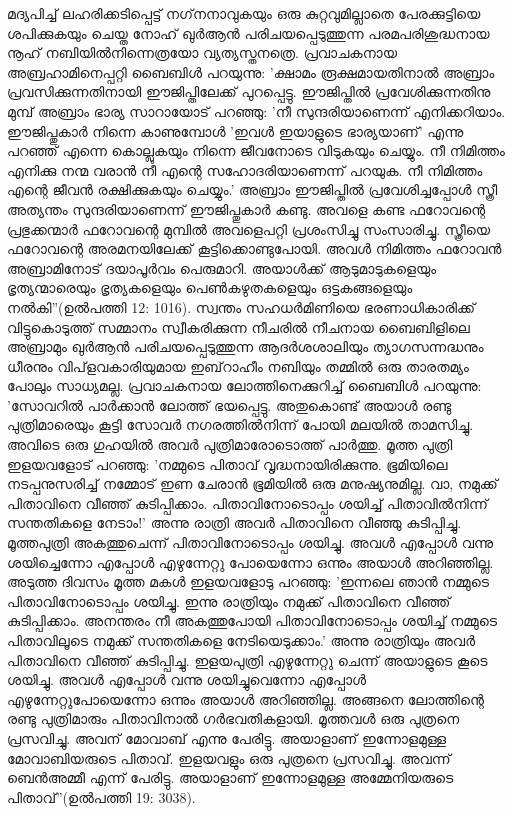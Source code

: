 മദ്യപിച്ച് ലഹരിക്കടിപ്പെട്ട് നഗ്‌നനാവുകയും ഒരു കുറ്റവുമില്ലാതെ പേരക്കുട്ടിയെ ശപിക്കുകയും ചെയ്ത നോഹ് ഖുര്‍ആന്‍ പരിചയപ്പെടുത്തുന്ന പരമപരിശുദ്ധനായ നൂഹ് നബിയില്‍നിന്നെത്രയോ വ്യത്യസ്തനത്രെ.
പ്രവാചകനായ അബ്രഹാമിനെപ്പറ്റി ബൈബിള്‍ പറയുന്നു: 'ക്ഷാമം രൂക്ഷമായതിനാല്‍ അബ്രാം പ്രവസിക്കുന്നതിനായി ഈജിപ്തിലേക്ക് പുറപ്പെട്ടു. ഈജിപ്തില്‍ പ്രവേശിക്കുന്നതിനു മുമ്പ് അബ്രാം ഭാര്യ സാറായോട് പറഞ്ഞു: 'നീ സുന്ദരിയാണെന്ന് എനിക്കറിയാം. ഈജിപ്തുകാര്‍ നിന്നെ കാണുമ്പോള്‍ 'ഇവള്‍ ഇയാളുടെ ഭാര്യയാണ്' എന്നു പറഞ്ഞ് എന്നെ കൊല്ലുകയും നിന്നെ ജീവനോടെ വിടുകയും ചെയ്യും. നീ നിമിത്തം എനിക്കു നന്മ വരാന്‍ നീ എന്റെ സഹോദരിയാണെന്ന് പറയുക. നീ നിമിത്തം എന്റെ ജീവന്‍ രക്ഷിക്കുകയും ചെയ്യും.' അബ്രാം ഈജിപ്തില്‍ പ്രവേശിച്ചപ്പോള്‍ സ്ത്രീ അത്യന്തം സുന്ദരിയാണെന്ന് ഈജിപ്തുകാര്‍ കണ്ടു. അവളെ കണ്ട ഫറോവന്റെ പ്രഭുക്കന്മാര്‍ ഫറോവന്റെ മുമ്പില്‍ അവളെപറ്റി പ്രശംസിച്ചു സംസാരിച്ചു. സ്ത്രീയെ ഫറോവന്റെ അരമനയിലേക്ക് കൂട്ടിക്കൊണ്ടുപോയി. അവള്‍ നിമിത്തം ഫറോവന്‍ അബ്രാമിനോട് ദയാപൂര്‍വം പെരുമാറി. അയാള്‍ക്ക് ആടുമാടുകളെയും ഭൃത്യന്മാരെയും ഭൃത്യകളെയും പെണ്‍കഴുതകളെയും ഒട്ടകങ്ങളെയും നല്‍കി''(ഉല്‍പത്തി 12: 1016).
സ്വന്തം സഹധര്‍മിണിയെ ഭരണാധികാരിക്ക് വിട്ടുകൊടുത്ത് സമ്മാനം സ്വീകരിക്കുന്ന നീചരില്‍ നീചനായ ബൈബിളിലെ അബ്രാമും ഖുര്‍ആന്‍ പരിചയപ്പെടുത്തുന്ന ആദര്‍ശശാലിയും ത്യാഗസന്നദ്ധനും ധീരനും വിപ്‌ളവകാരിയുമായ ഇബ്‌റാഹീം നബിയും തമ്മില്‍ ഒരു താരതമ്യം പോലും സാധ്യമല്ല.
പ്രവാചകനായ ലോത്തിനെക്കുറിച്ച് ബൈബിള്‍ പറയുന്നു: 'സോവറില്‍ പാര്‍ക്കാന്‍ ലോത്ത് ഭയപ്പെട്ടു. അതുകൊണ്ട് അയാള്‍ രണ്ടു പുത്രിമാരെയും കൂട്ടി സോവര്‍ നഗരത്തില്‍നിന്ന് പോയി മലയില്‍ താമസിച്ചു. അവിടെ ഒരു ഗുഹയില്‍ അവര്‍ പുത്രിമാരോടൊത്ത് പാര്‍ത്തു. മൂത്ത പുത്രി ഇളയവളോട് പറഞ്ഞു: 'നമ്മുടെ പിതാവ് വൃദ്ധനായിരിക്കുന്നു. ഭൂമിയിലെ നടപ്പനുസരിച്ച് നമ്മോട് ഇണ ചേരാന്‍ ഭൂമിയില്‍ ഒരു മനുഷ്യനുമില്ല. വാ, നമുക്ക് പിതാവിനെ വീഞ്ഞ് കുടിപ്പിക്കാം. പിതാവിനോടൊപ്പം ശയിച്ച് പിതാവില്‍നിന്ന് സന്തതികളെ നേടാം!' അന്നു രാത്രി അവര്‍ പിതാവിനെ വീഞ്ഞു കുടിപ്പിച്ചു. മൂത്തപുത്രി അകത്തുചെന്ന് പിതാവിനോടൊപ്പം ശയിച്ചു. അവള്‍ എപ്പോള്‍ വന്നു ശയിച്ചെന്നോ എപ്പോള്‍ എഴുന്നേറ്റു പോയെന്നോ ഒന്നും അയാള്‍ അറിഞ്ഞില്ല. അടുത്ത ദിവസം മൂത്ത മകള്‍ ഇളയവളോടു പറഞ്ഞു: 'ഇന്നലെ ഞാന്‍ നമ്മുടെ പിതാവിനോടൊപ്പം ശയിച്ചു. ഇന്നു രാത്രിയും നമുക്ക് പിതാവിനെ വീഞ്ഞ് കുടിപ്പിക്കാം. അനന്തരം നീ അകത്തുപോയി പിതാവിനോടൊപ്പം ശയിച്ച് നമ്മുടെ പിതാവിലൂടെ നമുക്ക് സന്തതികളെ നേടിയെടുക്കാം.' അന്നു രാത്രിയും അവര്‍ പിതാവിനെ വീഞ്ഞ് കുടിപ്പിച്ചു. ഇളയപുത്രി എഴുന്നേറ്റു ചെന്ന് അയാളുടെ കൂടെ ശയിച്ചു. അവള്‍ എപ്പോള്‍ വന്നു ശയിച്ചുവെന്നോ എപ്പോള്‍ എഴുന്നേറ്റുപോയെന്നോ ഒന്നും അയാള്‍ അറിഞ്ഞില്ല. അങ്ങനെ ലോത്തിന്റെ രണ്ടു പുത്രിമാരും പിതാവിനാല്‍ ഗര്‍ഭവതികളായി. മൂത്തവള്‍ ഒരു പുത്രനെ പ്രസവിച്ചു. അവന് മോവാബ് എന്നു പേരിട്ടു. അയാളാണ് ഇന്നോളമുള്ള മോവാബിയരുടെ പിതാവ്. ഇളയവളും ഒരു പുത്രനെ പ്രസവിച്ചു. അവന്ന് ബെന്‍അമ്മീ എന്ന് പേരിട്ടു. അയാളാണ് ഇന്നോളമുള്ള അമ്മേനിയരുടെ പിതാവ്''(ഉല്‍പത്തി 19: 3038).
